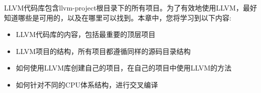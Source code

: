 
LLVM代码库包含llvm-project根目录下的所有项目。为了有效地使用LLVM，最好知道哪些是可用的，以及在哪里可以找到。本章中，您将学习到以下内容:\par

\begin{itemize}
	\item LLVM代码库的内容，包括最重要的顶层项目
	\item LLVM项目的结构，所有项目都遵循同样的源码目录结构
	\item 如何使用LLVM库创建自己的项目，在自己的项目中使用LLVM的方法
	\item 如何针对不同的CPU体系结构，进行交叉编译
\end{itemize}

\newpage

